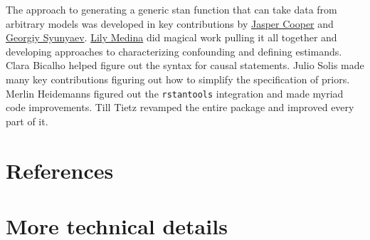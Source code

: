 \documentclass[
  article]{jss}
\newlength{\cslhangindent}
\newlength{\cslentryspacingunit} %
\newenvironment{CSLReferences}[2] %
 {%
  \setlength{\parindent}{0pt}
  \ifodd #1
  \let\oldpar\par
  \def\par{\hangindent=\cslhangindent\oldpar}
  \fi
  \setlength{\parskip}{#2\cslentryspacingunit}
 }%
 {}
\begin{document}
\begin{tcolorbox}[enhanced jigsaw, colframe=quarto-callout-color-frame, bottomrule=.15mm, leftrule=.75mm, toprule=.15mm, colback=white, arc=.35mm, opacityback=0, rightrule=.15mm, left=2mm, breakable]

The approach to generating a generic stan function that can take data
from arbitrary models was developed in key contributions by
\href{http://jasper-cooper.com/}{Jasper Cooper} and
\href{http://gsyunyaev.com/}{Georgiy Syunyaev}.
\href{https://lilymedina.github.io/}{Lily Medina} did magical work
pulling it all together and developing approaches to characterizing
confounding and defining estimands. Clara Bicalho helped figure out the
syntax for causal statements. Julio Solis made many key contributions
figuring out how to simplify the specification of priors. Merlin
Heidemanns figured out the \texttt{rstantools} integration and made
myriad code improvements. Till Tietz revamped the entire package and
improved every part of it.

\end{tcolorbox}

\hypertarget{references}{%
\section*{References}\label{references}}

\hypertarget{refs}{}
\begin{CSLReferences}{0}{0}
\end{CSLReferences}

\newpage{}

\hypertarget{sec-techdetails}{%
\section*{More technical details}\label{sec-techdetails}}
\end{document}
